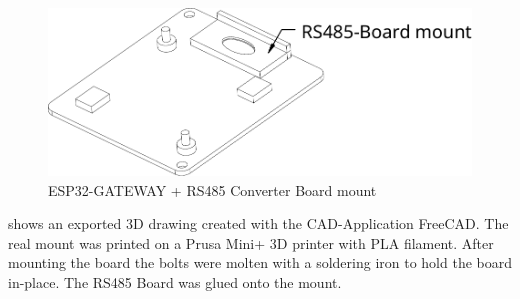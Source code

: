 		\begin{figure}
			\centering
			\includegraphics[width=0.8\linewidth]{assets/RD-board-mount}
			\caption{ESP32-GATEWAY + RS485 Converter Board mount}
			\label{fig:board-mount}
		\end{figure}
		
		 shows an exported 3D drawing created with the CAD-Application FreeCAD. The real mount was printed on a Prusa Mini+ 3D printer with PLA filament. After mounting the board the bolts were molten with a soldering iron to hold the board in-place. The RS485 Board was glued onto the mount.